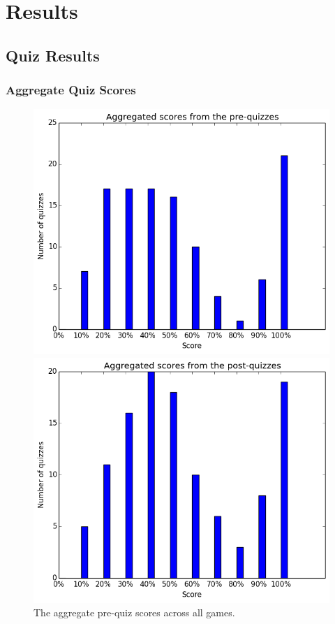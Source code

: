 \section{Results}

	\subsection{Quiz Results}

		\subsubsection{Aggregate Quiz Scores}

			\begin{figure}[h] 
			\centering 
			\begin{minipage}[b]{0.45\linewidth}
			\includegraphics[height=0.33\textheight]{general_pre.png} 
			\caption{The aggregate pre-quiz scores across all games.}
			\end{minipage}
			\quad
			\begin{minipage}[b]{0.45\linewidth}
			\includegraphics[height=0.33\textheight]{general_post.png} 

\end{minipage}
\end{figure}

